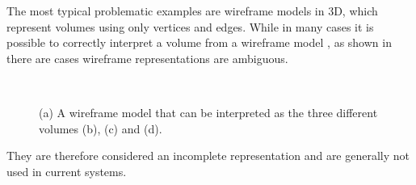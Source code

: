 The most typical problematic examples are wireframe models in 3D, which represent volumes using only vertices and edges.
While in many cases it is possible to correctly interpret a volume from a wireframe model \citep{Brewer86,Hanrahan82}, as shown in  there are cases wireframe representations are ambiguous.
\begin{figure}[tbp]
\centering
{}
\quad
{}
\\
\quad
{}
\caption[A wireframe model can have different interpretations]{(a) A wireframe model that can be interpreted as the three different volumes (b), (c) and (d).}
\label{fig:wireframe}
\end{figure}
They are therefore considered an incomplete representation and are generally not used in current systems.

